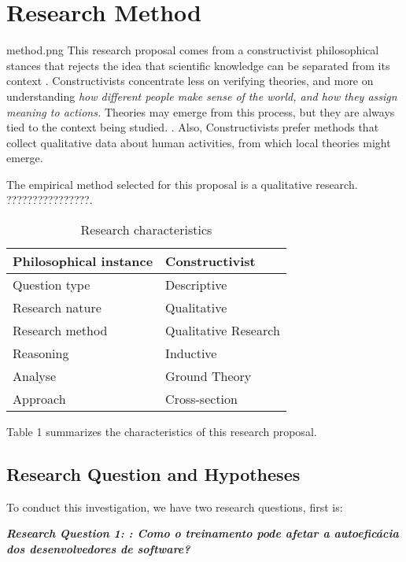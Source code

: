 \documentclass{TheMartianReport}
\begin{document}
\section{Research Method}{method.png}
This research proposal comes from a constructivist philosophical stances that rejects the idea that scientific knowledge can be separated from its context \cite{easterbrook2008selecting}.
 Constructivists concentrate less on verifying theories, and more on understanding \textit{how different people make sense of the world, and how they assign meaning to actions.} Theories may emerge from this process, but they are always tied to the context being studied. \cite{easterbrook2008selecting}. Also, Constructivists prefer methods that collect  qualitative data about human activities, from which local theories might emerge. 


The empirical method selected for this proposal is a qualitative research. ????????????????\cite{easterbrook2008selecting}. 



\begin{table}[h]
\centering
\caption{Research characteristics}
\begin{tabular}{ll}
\hline
Philosophical instance & Constructivist   \\ \hline
Question type          & Descriptive \\ \hline
Research nature        & Qualitative \\ \hline
Research method        & Qualitative Research       \\ \hline
Reasoning              & Inductive      \\ \hline
Analyse                & Ground Theory  \\ \hline
Approach               & Cross-section   \\ \hline

\end{tabular}
\end{table}

Table 1 summarizes the characteristics of this research proposal.

\subsection{Research Question and Hypotheses }

To conduct this investigation, we have two research questions, first is:
 \newline

\textbf{\textit{Research Question 1: : Como o treinamento pode afetar a autoeficácia dos desenvolvedores de software?}}
 \newline
\end{document}
